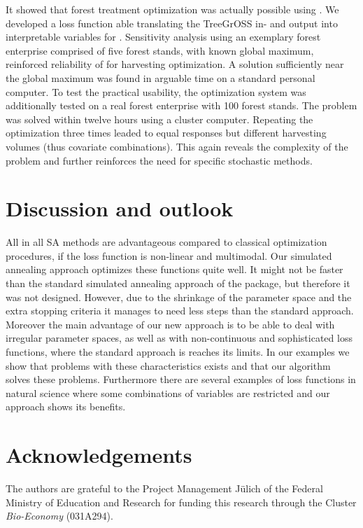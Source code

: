 It showed that forest treatment optimization was actually possible using . We developed a loss function able translating the TreeGrOSS in- and output into interpretable variables for . Sensitivity analysis using an exemplary forest enterprise comprised of five forest stands, with known global maximum, reinforced reliability of  for harvesting optimization. A solution sufficiently near the global maximum was found in arguable time on a standard personal computer. To test the practical usability, the optimization system was additionally tested on a real forest enterprise with 100 forest stands. The problem was solved within twelve hours using a cluster computer. Repeating the optimization three times leaded to equal responses but different harvesting volumes (thus covariate combinations). This again reveals the complexity of the problem and further reinforces the need for specific stochastic methods.

\section{Discussion and outlook}
All in all SA methods are advantageous compared to classical optimization procedures, if the loss function is non-linear and multimodal. Our simulated annealing approach optimizes these functions quite well. It might not be faster than the standard simulated annealing approach of the  package, but therefore it was not designed. However, due to the shrinkage of the parameter space and the extra stopping criteria it manages to need less steps than the standard approach. Moreover the main advantage of our new approach is to be able to deal with irregular parameter spaces, as well as with non-continuous and sophisticated loss functions, where the standard approach is reaches its limits. In our examples we show that problems with these characteristics exists and that our algorithm solves these problems. Furthermore there are several examples of loss functions in natural science where some combinations of variables are restricted and our approach shows its benefits.

\section{Acknowledgements}
The authors are grateful to the Project Management Jülich of the Federal Ministry of Education and Research for funding this research through the Cluster \textit{Bio-Economy} (031A294).


